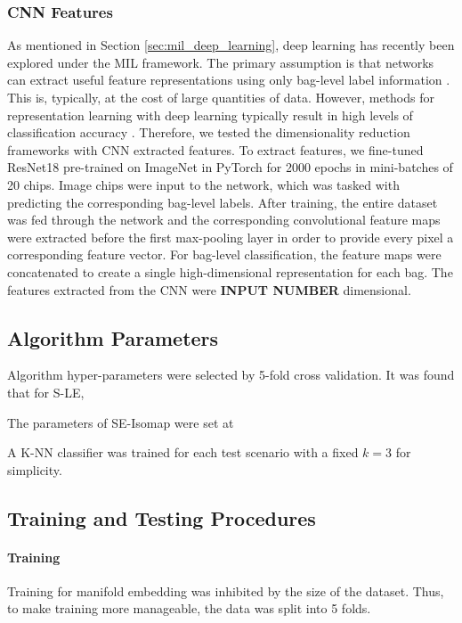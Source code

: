 \subsubsection{CNN Features}
As mentioned in Section \ref{sec:mil_deep_learning}, deep learning has recently been explored under the MIL framework.  The primary assumption is that networks can extract useful feature representations using only bag-level label information \citep{Ghaffarzadegan2018MILVAE}.  This is, typically, at the cost of large quantities of data.  However, methods for representation learning with deep learning typically result in high levels of classification accuracy \citep{Bengio2014RepLearningReview}.  Therefore, we tested the dimensionality reduction frameworks with CNN extracted features.  To extract features, we fine-tuned ResNet18 \citep{He2015ResNet} pre-trained on ImageNet \citep{Deng2009ImageNet} in PyTorch for 2000 epochs in mini-batches of 20 chips.  Image chips were input to the network, which was tasked with predicting the corresponding bag-level labels.  After training, the entire dataset was fed through the network and the corresponding convolutional feature maps were extracted before the first max-pooling layer in order to provide every pixel a corresponding feature vector.  For bag-level classification, the feature maps were concatenated to create a single high-dimensional representation for each bag.  The features extracted from the CNN were \textbf{INPUT NUMBER} dimensional.

\subsection{Algorithm Parameters}
Algorithm hyper-parameters were selected by 5-fold cross validation.  It was found that for S-LE, 

The parameters of SE-Isomap were set at

A K-NN classifier was trained for each test scenario with a fixed $k=3$ for simplicity.  

\subsection{Training and Testing Procedures}

\paragraph{Training}
Training for manifold embedding was inhibited by the size of the dataset.  Thus, to make training more manageable, the data was split into 5 folds.   


